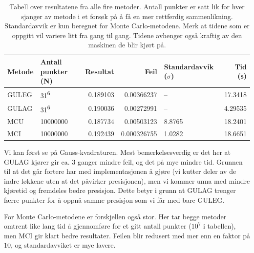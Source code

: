 \documentclass[11pt]{article}
\begin{document}
\begin{table}[ht]
\centering
\caption{\label{tab:1} Tabell over resultatene fra alle fire
  metoder. Antall punkter er satt lik for hver sjanger av metode i et
  forsøk på å få en mer rettferdig sammenlikning. Standardavvik er kun beregnet for Monte
  Carlo-metodene. Merk at tidene som er oppgitt vil variere litt fra
  gang til gang. Tidene avhenger også kraftig av den maskinen de blir
  kjørt på.}
\vspace{0.5cm}
\begin{tabular}{llrrlr}
Metode & Antall punkter (N) & Resultat & Feil & Standardavvik ($\sigma$) & Tid (s) \\
\hline
GULEG & 31\textsuperscript{6} & 0.189103 & 0.00366237 & -- & 17.3418 \\
GULAG & 31\textsuperscript{6} & 0.190036 & 0.00272991 & -- & 4.29535 \\
MCU & \num{10000000} & 0.187734 & 0.00503123 & 8.8765 & 18.2401 \\
MCI & \num{10000000} & 0.192439 & 0.000326755 & 1.0282 & 18.6651 \\
\end{tabular}
\end{table}

Vi kan først se på Gauss-kvadraturen. Mest bemerkelsesverdig er det
her at GULAG kjører gir ca. 3 ganger mindre feil, og det på mye mindre
tid. Grunnen til at det går fortere har med implementasjonen å gjøre
(vi kutter deler av de indre løkkene uten at det påvirker
presisjonen), men vi kommer unna med mindre kjøretid og fremdeles
bedre presisjon. Dette betyr i grunn at GULAG trenger færre punkter
for å oppnå samme presisjon som vi får med bare GULEG. 

For Monte Carlo-metodene er forskjellen også stor. Her tar begge
metoder omtrent like lang tid å gjennomføre for et gitt antall punkter
($10^7$ i tabellen), men MCI gir klart bedre resultater. Feilen blir
redusert med mer enn en faktor på $10$, og standardavviket er mye
lavere. 
\end{document}
